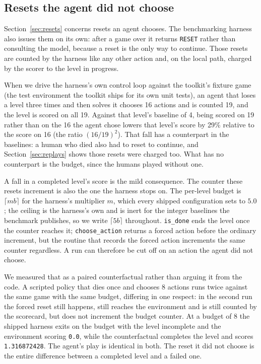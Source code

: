 \documentclass[11pt]{article}
\newcommand{\code}[1]{\texttt{#1}}
\begin{document}
\subsection{Resets the agent did not choose}
\label{sec:forced}

Section~\ref{sec:resets} concerns resets an agent chooses. The benchmarking harness
also issues them on its own: after a game over it returns \code{RESET} rather
than consulting the model, because a reset is the only way to continue. Those
resets are counted by the harness like any other action and, on the local path,
charged by the scorer to the level in progress.

When we drive the harness's own control loop against the toolkit's fixture game
(the test environment the toolkit ships for its own unit tests), an
agent that loses a level three times and then solves it chooses 16 actions and
is counted 19, and the level is scored on all 19. Against that level's baseline
of 4, being scored on 19 rather than on the 16 the agent chose lowers that level's
score by 29\% relative to the score on 16 (the ratio $(16/19)^2$). That fall has a
counterpart in the baselines: a human who died also had to reset to continue,
and Section~\ref{sec:replays} shows those resets were charged too. What has no
counterpart is the budget, since the humans played without one.

A fall in a completed level's score is the mild consequence. The counter these
resets increment is also the one the harness stops on. The per-level budget is
$\lceil mb \rceil$ for the harness's multiplier $m$, which every shipped
configuration sets to $5.0$; the ceiling is the harness's own and is inert for
the integer baselines the benchmark publishes, so we write $\lceil 5b \rceil$
throughout. \code{is\_done} ends the level once the
counter reaches it; \code{choose\_action} returns a forced action before the
ordinary increment, but the routine that records the forced action increments
the same counter regardless. A run can therefore be cut off on an action the
agent did not choose.

We measured that as a paired counterfactual rather than arguing it from the
code. A scripted policy that dies once and chooses 8 actions runs twice against the same game with the same
budget, differing in one respect: in the second run the forced reset still
happens, still reaches the environment and is still counted by the scorecard,
but does not increment the budget counter. At a budget of 8 the shipped harness exits on the budget with the level
incomplete and the environment scoring \code{0.0}, while the counterfactual
completes the level and scores \code{1.316872428}. The agent's play is identical
in both. The reset it did not choose is the entire difference between a
completed level and a failed one.
\end{document}
